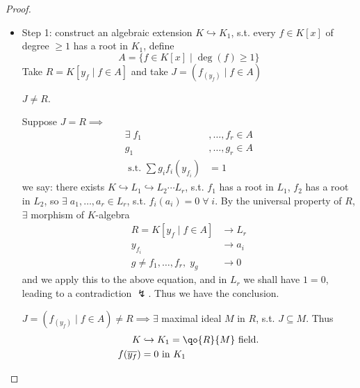 \begin{proof}
	\leavevmode
	\begin{itemize}
		\item Step 1: construct an algebraic extension \( K \hookrightarrow K_1 \), s.t. every \( f\in
		      K[x] \) of degree \( \geq 1 \) has a root in \( K_1 \), define
		      \[
			      A = \{f\in K[x] \; | \; \deg(f) \geq 1\}
		      \]
		      Take \( R = K[y_f \; | \; f\in A] \) and take \( J = (f_{(y_f)} \; | \; f \in A) \)
		      \begin{claim}
			      \( J \neq R \).
		      \end{claim}
		      Suppose \( J = R \implies \)
		      \[
			      \begin{aligned}
				      \exists \; f_1                       & , \ldots, f_r \in A \\
				      g_1                                  & , \ldots, g_r \in A \\
				      \text{ s.t. } \sum g_i f_i (y_{f_i}) & = 1
			      \end{aligned}
		      \]
		      we say: there exists \( K \hookrightarrow L_1 \hookrightarrow L_2 \cdots L_r \), s.t. \( f_1 \) has a root in \( L_1 \),
		      \( f_2 \) has a root in \( L_2 \), so \( \exists \; a_1,\ldots, a_r \in L_r \), s.t. \(
		      f_i (a_i) = 0 \; \forall \; i \). By the universal property of \( R \), \( \exists \)
		      morphism of \( K \)-algebra
		      \[
			      \begin{aligned}
				      R = K[y_f \; | \; f \in A]     & \to L_r \\
				      y_{f_i}                        & \to a_i \\
				      g \ne f_1, \ldots, f_r, \; y_g & \to 0
			      \end{aligned}
		      \]
		      and we apply this to the above equation, and in \( L_r \) we shall have \( 1 = 0 \),
		      leading to a contradiction \( \lightning \). Thus we have the conclusion.
		      \begin{conclusion}
			      \( J = (f_{(y_f)} \; | \; f \in A) \ne R  \implies \exists\) maximal ideal \( M \) in \( R \), s.t.
			      \( J \subseteq M \). Thus
			      \[
				      \begin{aligned}
					      K                 & \hookrightarrow K_1 = \qo{R}{M} \text{ field.} \\
					      f(\overline{y_f}) & = 0 \text{ in } K_1
				      \end{aligned}
			      \]
		      \end{conclusion}


\end{itemize}
\end{proof}
